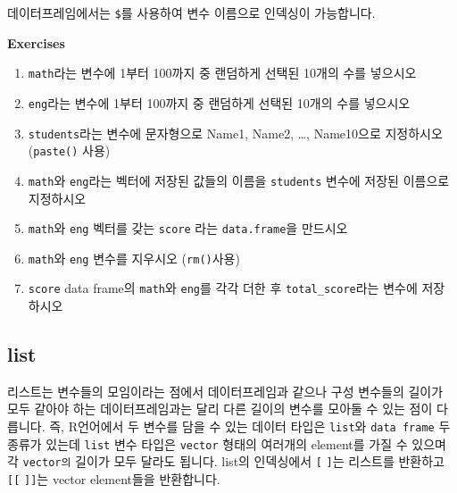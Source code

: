 \documentclass[
]{book}
\newenvironment{Shaded}{\begin{snugshade}}{\end{snugshade}}
\newcommand{\DecValTok}[1]{\textcolor[rgb]{0.00,0.00,0.81}{#1}}
\newcommand{\DocumentationTok}[1]{\textcolor[rgb]{0.56,0.35,0.01}{\textbf{\textit{#1}}}}
\newcommand{\NormalTok}[1]{#1}
\newcommand{\SpecialCharTok}[1]{\textcolor[rgb]{0.00,0.00,0.00}{#1}}
\newcommand{\StringTok}[1]{\textcolor[rgb]{0.31,0.60,0.02}{#1}}
\providecommand{\tightlist}{%
  \setlength{\itemsep}{0pt}\setlength{\parskip}{0pt}}
\begin{document}
데이터프레임에서는 \texttt{\$}를 사용하여 변수 이름으로 인덱싱이 가능합니다.

\begin{Shaded}
\end{Shaded}

\textbf{Exercises}

\begin{enumerate}
\def\labelenumi{\arabic{enumi}.}
\tightlist
\item
  \texttt{math}라는 변수에 1부터 100까지 중 랜덤하게 선택된 10개의 수를 넣으시오
\item
  \texttt{eng}라는 변수에 1부터 100까지 중 랜덤하게 선택된 10개의 수를 넣으시오
\item
  \texttt{students}라는 변수에 문자형으로 Name1, Name2, \ldots, Name10으로 지정하시오 (\texttt{paste()} 사용)
\item
  \texttt{math}와 \texttt{eng}라는 벡터에 저장된 값들의 이름을 \texttt{students} 변수에 저장된 이름으로 지정하시오
\item
  \texttt{math}와 \texttt{eng} 벡터를 갖는 \texttt{score} 라는 \texttt{data.frame}을 만드시오
\item
  \texttt{math}와 \texttt{eng} 변수를 지우시오 (\texttt{rm()}사용)
\item
  \texttt{score} data frame의 \texttt{math}와 \texttt{eng}를 각각 더한 후 \texttt{total\_score}라는 변수에 저장 하시오
\end{enumerate}

\hypertarget{list}{%
\subsection{list}\label{list}}

리스트는 변수들의 모임이라는 점에서 데이터프레임과 같으나 구성 변수들의 길이가 모두 같아야 하는 데이터프레임과는 달리 다른 길이의 변수를 모아둘 수 있는 점이 다릅니다. 즉, R언어에서 두 변수를 담을 수 있는 데이터 타입은 \texttt{list}와 \texttt{data\ frame} 두 종류가 있는데 \texttt{list} 변수 타입은 \texttt{vector} 형태의 여러개의 element를 가질 수 있으며 각 \texttt{vector의} 길이가 모두 달라도 됩니다. list의 인덱싱에서 \texttt{{[}} \texttt{{]}}는 리스트를 반환하고 \texttt{{[}{[}} \texttt{{]}{]}}는 vector element들을 반환합니다.
\end{document}
